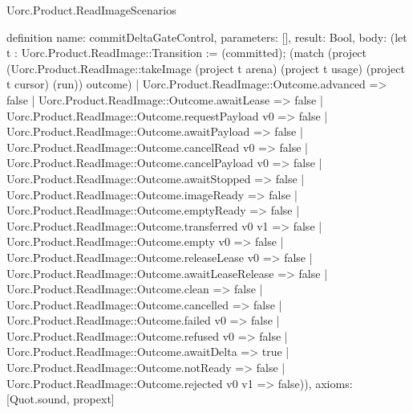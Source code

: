 \begin{lexlean}{Uorc.Product.ReadImageScenarios}
\begin{semanticmodule}
definition{
  name: commitDeltaGateControl,
  parameters: [],
  result: Bool,
  body: (let t : Uorc.Product.ReadImage::Transition := (committed); (match (project (Uorc.Product.ReadImage::takeImage (project t arena) (project t usage) (project t cursor) (run)) outcome)
    | Uorc.Product.ReadImage::Outcome.advanced => false
    | Uorc.Product.ReadImage::Outcome.awaitLease => false
    | Uorc.Product.ReadImage::Outcome.requestPayload v0 => false
    | Uorc.Product.ReadImage::Outcome.awaitPayload => false
    | Uorc.Product.ReadImage::Outcome.cancelRead v0 => false
    | Uorc.Product.ReadImage::Outcome.cancelPayload v0 => false
    | Uorc.Product.ReadImage::Outcome.awaitStopped => false
    | Uorc.Product.ReadImage::Outcome.imageReady => false
    | Uorc.Product.ReadImage::Outcome.emptyReady => false
    | Uorc.Product.ReadImage::Outcome.transferred v0 v1 => false
    | Uorc.Product.ReadImage::Outcome.empty v0 => false
    | Uorc.Product.ReadImage::Outcome.releaseLease v0 => false
    | Uorc.Product.ReadImage::Outcome.awaitLeaseRelease => false
    | Uorc.Product.ReadImage::Outcome.clean => false
    | Uorc.Product.ReadImage::Outcome.cancelled => false
    | Uorc.Product.ReadImage::Outcome.failed v0 => false
    | Uorc.Product.ReadImage::Outcome.refused v0 => false
    | Uorc.Product.ReadImage::Outcome.awaitDelta => true
    | Uorc.Product.ReadImage::Outcome.notReady => false
    | Uorc.Product.ReadImage::Outcome.rejected v0 v1 => false)),
  axioms: [Quot.sound, propext]
}


\end{semanticmodule}
\end{lexlean}
